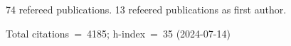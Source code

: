 74 refereed publications. 13 refeered publications as first author.

Total citations~=~4185; h-index~=~35 (2024-07-14)